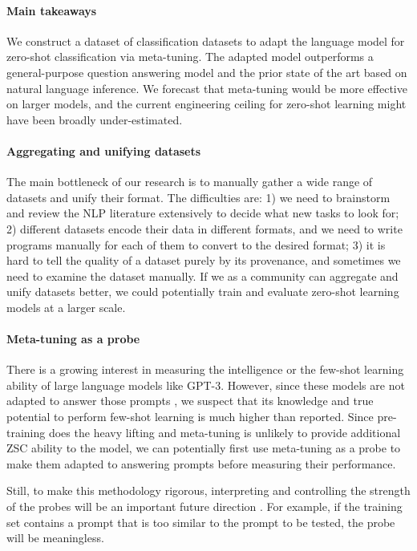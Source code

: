 \paragraph{Main takeaways} We construct a dataset of classification datasets to adapt the language model for zero-shot classification via meta-tuning. The adapted model outperforms a general-purpose question answering model and the prior state of the art based on natural language inference. We forecast that meta-tuning would be more effective on larger models, and the current engineering ceiling for zero-shot learning might have been broadly under-estimated.

\paragraph{Aggregating and unifying datasets} The main bottleneck of our research is to manually gather a wide range of datasets and unify their format. The difficulties are: 1) we need to brainstorm and review the NLP literature extensively to decide what new tasks to look for; 2) different datasets encode their data in different formats, and we need to write programs manually for each of them to convert to the desired format; 3) it is hard to tell the quality of a dataset purely by its provenance, and sometimes we need to examine the dataset manually. If we as a community can aggregate and unify datasets better, we could potentially train and evaluate zero-shot learning models at a larger scale.

\paragraph{Meta-tuning as a probe} There is a growing interest in measuring the intelligence \cite{hendrycks2021aligning, hendrycks2021measuring} or the few-shot learning ability \cite{brown2020language} of large language models like GPT-3. However, since these models are not adapted to answer those prompts \cite{DBLP:journals/corr/abs-2104-08315}, we suspect that its knowledge and true potential to perform few-shot learning is much higher than reported. Since pre-training does the heavy lifting and meta-tuning is unlikely to provide additional ZSC ability to the model, we can potentially first use meta-tuning as a probe to make them adapted to answering prompts before measuring their performance.

Still, to make this methodology rigorous, interpreting and controlling the strength of the probes will be an important future direction \cite{hewitt-liang-2019-designing}. For example, if the training set contains a prompt that is too similar to the prompt to be tested, the probe will be meaningless.

